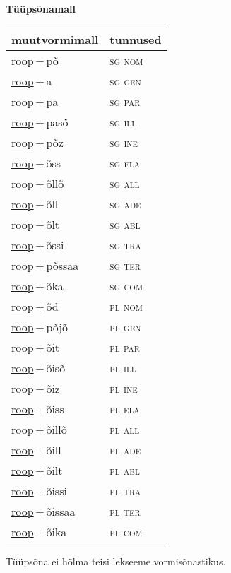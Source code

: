
\vspace{1.8em}
\begin{minipage}{\textwidth}
\textbf{Tüüpsõnamall \,}\\

\begin{sideways}
\begin{tabular}{l l}
muutvormimall & tunnused \\
\hline
\underline{roop}\,+\,põ & \textsc{ sg nom } \\
\underline{roop}\,+\,a & \textsc{ sg gen } \\
\underline{roop}\,+\,pa & \textsc{ sg par } \\
\underline{roop}\,+\,pasõ & \textsc{ sg ill } \\
\underline{roop}\,+\,põz & \textsc{ sg ine } \\
\underline{roop}\,+\,õss & \textsc{ sg ela } \\
\underline{roop}\,+\,õllõ & \textsc{ sg all } \\
\underline{roop}\,+\,õll & \textsc{ sg ade } \\
\underline{roop}\,+\,õlt & \textsc{ sg abl } \\
\underline{roop}\,+\,õssi & \textsc{ sg tra } \\
\underline{roop}\,+\,põssaa & \textsc{ sg ter } \\
\underline{roop}\,+\,õka & \textsc{ sg com } \\
\underline{roop}\,+\,õd & \textsc{ pl nom } \\
\underline{roop}\,+\,põjõ & \textsc{ pl gen } \\
\underline{roop}\,+\,õit & \textsc{ pl par } \\
\underline{roop}\,+\,õisõ & \textsc{ pl ill } \\
\underline{roop}\,+\,õiz & \textsc{ pl ine } \\
\underline{roop}\,+\,õiss & \textsc{ pl ela } \\
\underline{roop}\,+\,õillõ & \textsc{ pl all } \\
\underline{roop}\,+\,õill & \textsc{ pl ade } \\
\underline{roop}\,+\,õilt & \textsc{ pl abl } \\
\underline{roop}\,+\,õissi & \textsc{ pl tra } \\
\underline{roop}\,+\,õissaa & \textsc{ pl ter } \\
\underline{roop}\,+\,õika & \textsc{ pl com } \\
\end{tabular}
\end{sideways}
\label{tab:tüüpsõnamall-rooppõ}

\end{minipage}

 
\vspace{1em}
\noindent Tüüpsõna ei hõlma teisi lekseeme vormi\-sõnastikus.
